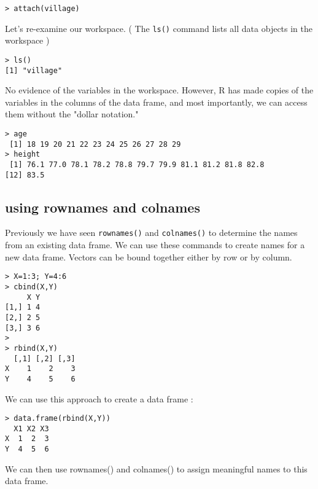 \begin{verbatim}
> attach(village)
\end{verbatim}

Let's re-examine our workspace. ( The \texttt{ls()} command lists all data objects in the workspace )
\begin{verbatim}
> ls()
[1] "village"
\end{verbatim}

No evidence of the variables in the workspace. However, R has made copies of the variables in the columns of the data frame, and most importantly, we can access them without the "dollar notation."
\begin{verbatim}
> age
 [1] 18 19 20 21 22 23 24 25 26 27 28 29
> height
 [1] 76.1 77.0 78.1 78.2 78.8 79.7 79.9 81.1 81.2 81.8 82.8
[12] 83.5
\end{verbatim}
\subsection{using rownames and colnames}
Previously we have seen \texttt{rownames()} and \texttt{colnames()} to determine the names from an existing data frame. We can use these commands to create names for a new data frame.
Vectors can be bound together either by row or by column.
\begin{verbatim}
> X=1:3; Y=4:6
> cbind(X,Y)
     X Y
[1,] 1 4
[2,] 2 5
[3,] 3 6
>
> rbind(X,Y)
  [,1] [,2] [,3]
X    1    2    3
Y    4    5    6
\end{verbatim}

We can use this approach to create a data frame :

\begin{verbatim}
> data.frame(rbind(X,Y))
  X1 X2 X3
X  1  2  3
Y  4  5  6
\end{verbatim}

We can then use rownames() and colnames() to assign meaningful names to this data frame.


